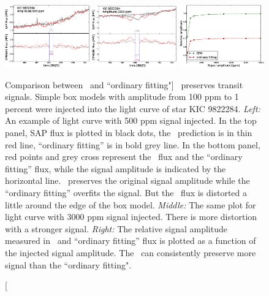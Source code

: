 \begin{figure}[p]
\begin{center}
\includegraphics[width=0.325\textwidth]{figures/cpm/f4a}
\includegraphics[width=0.325\textwidth]{figures/cpm/f4b}
\includegraphics[width=0.325\textwidth]{figures/cpm/f4c}
\end{center}
\caption[Comparison between \name\ and ``ordinary fitting"]{
  \label{distortion} 
  \name\ preserves transit signals.
  Simple box models with amplitude from 100 ppm to 1 percent were injected into the light curve of star KIC 9822284. 
  \emph{Left:} An example of light curve with 500 ppm signal injected. In the top panel, SAP flux is plotted in black dots, the \name\ prediction is in thin red line, ``ordinary fitting'' is in bold grey line.
  In the bottom panel, red points and grey cross represent the \name\ flux and the ``ordinary fitting'' flux, while the signal amplitude is indicated by the horizontal line. 
  \name\ preserves the original signal amplitude while the ``ordinary fitting'' overfits the signal. 
  But the \name\ flux is distorted a little around the edge of the box model.
  \emph{Middle:} The same plot for light curve with 3000 ppm signal injected. There is more distortion with a stronger signal.
  \emph{Right:} The relative signal amplitude measured in \name\ and ``ordinary fitting'' flux is plotted as a function of the injected signal amplitude.
  The \name\ can consistently preserve more signal than the ``ordinary fitting".
}
\end{figure}


